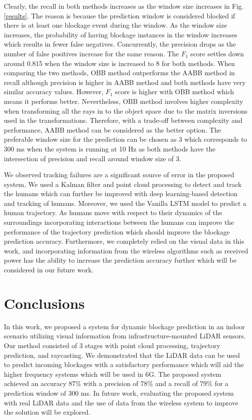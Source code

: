 \documentclass[conference]{IEEEtran}
\begin{document}
Clearly, the recall in both methods increases as the window size increases in Fig. \ref{results}. The reason is because the prediction window is considered blocked if there is at least one blockage event during the window. As the window size increases, the probability of having blockage instances in the window increases which results in fewer false negatives. Concurrently, the precision drops as the number of false positives increase for the same reason. The $F_1$ score settles down around 0.815 when the window size is increased to 8 for both methods.
When comparing the two methods, OBB method outperforms the AABB method in recall although precision is higher in AABB method and both methods have very similar accuracy values. However, $F_1$ score is higher with OBB method which means it performs better. Nevertheless, OBB method involves higher complexity when transforming all the rays in to the object space due to the matrix inversions used in the transformations. Therefore, with a trade-off between complexity and performance, AABB method can be considered as the better option. The preferable window size for the prediction can be chosen as 3 which corresponds to 300 ms when the system is running at 10 Hz as both methods have the intersection of precision and recall around window size  of 3. 

We observed tracking failures are a significant source of error in the proposed system. We used a Kalman filter and point cloud processing to detect and track the humans which can further be improved with deep learning-based detection and tracking of humans. Moreover, we used the Vanilla LSTM model to predict a human trajectory. As humans move with respect to their dynamics of the surroundings incorporating interactions between the humans can improve the performance of the trajectory prediction \cite{trajnet} which should improve the blockage prediction accuracy. Furthermore, we completely relied on the visual data in this work, and incorporating information from the wireless algorithms such as received power has the ability to increase the prediction accuracy further which will be considered in our future work. 

\section{Conclusions}
In this work, we proposed a system for dynamic blockage prediction in an indoor scenario utilizing visual information from infrastructure-mounted LiDAR sensors. Our method consisted of 3 stages with point cloud processing, trajectory prediction, and raycasting. We demonstrated that the LiDAR data can be used to predict incoming blockages with a satisfactory performance which will aid the higher frequency systems which will be used in 6G. The proposed system achieved an accuracy 87\% with a precision of 78\% and a recall of 79\% for a prediction window of 300 ms. In future work, evaluating the proposed system with real LiDAR data and the use of data from the wireless system to improve the solution will be explored. 
\end{document}
